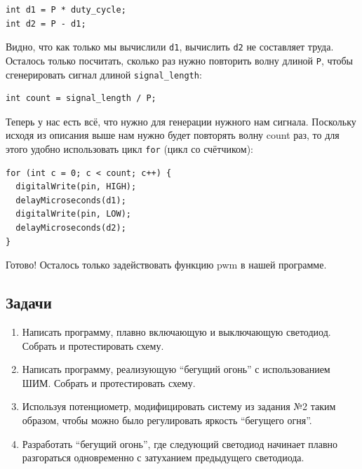 \documentclass[a4paper,twoside]{book}
\begin{document}
\begin{verbatim}
int d1 = P * duty_cycle;
int d2 = P - d1;
\end{verbatim}

Видно, что как только мы вычислили \texttt{d1}, вычислить \texttt{d2} не
составляет труда. Осталось только посчитать, сколько раз нужно повторить волну
длиной \texttt{P}, чтобы сгенерировать сигнал длиной \texttt{signal\_length}:

\begin{verbatim}
int count = signal_length / P;
\end{verbatim}

Теперь у нас есть всё, что нужно для генерации нужного нам сигнала. Поскольку
исходя из описания выше нам нужно будет повторять волну count раз, то для этого
удобно использовать цикл \texttt{for} (цикл со счётчиком):

\begin{verbatim}
for (int c = 0; c < count; c++) {
  digitalWrite(pin, HIGH);
  delayMicroseconds(d1);
  digitalWrite(pin, LOW);
  delayMicroseconds(d2);
}
\end{verbatim}

Готово! Осталось только задействовать функцию pwm в нашей программе.

\subsection{Задачи}

\begin{enumerate}
\item Написать программу, плавно включающую и выключающую светодиод. Собрать и
  протестировать схему. 
\item Написать программу, реализующую ``бегущий огонь'' с использованием ШИМ.
  Собрать и протестировать схему.
\item Используя потенциометр, модифицировать систему из задания №2 таким
  образом, чтобы можно было регулировать яркость ``бегущего огня''.
\item Разработать ``бегущий огонь'', где следующий светодиод начинает плавно
  разгораться одновременно с затуханием предыдущего светодиода.
\end{enumerate}


\end{document}
